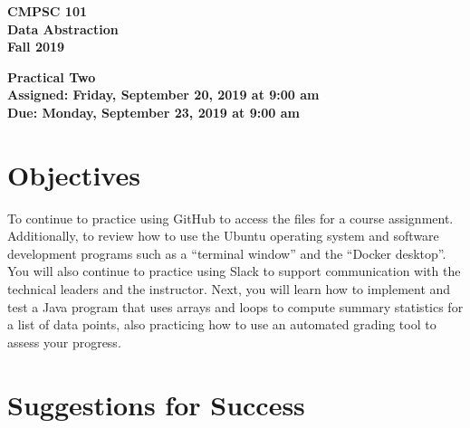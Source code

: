 \documentclass[11pt]{article}
\newcommand{\assignmentduedate}{September 23}
\newcommand{\assignmentassignedate}{September 20}
\newcommand{\assignmentnumber}{Two}
\newcommand{\labyear}{2019}
\newcommand{\labdueday}{Monday}
\newcommand{\labassignday}{Friday}
\newcommand{\labtime}{9:00 am}
\newcommand{\assigneddate}{Assigned: \labassignday, \assignmentassignedate, \labyear{} at \labtime{}}
\newcommand{\duedate}{Due: \labdueday, \assignmentduedate, \labyear{} at \labtime{}}
\newcommand{\labtitle}[1]
{
  \begin{center}
    \begin{center}
      \bf
      CMPSC 101\\Data Abstraction\\
      Fall 2019\\
      \medskip
    \end{center}
    \bf
    #1
  \end{center}
}
\begin{document}
\thispagestyle{empty}

\labtitle{Practical \assignmentnumber{} \\ \assigneddate{} \\ \duedate{}}

\section*{Objectives}

To continue to practice using GitHub to access the files for a course
assignment. Additionally, to review how to use the Ubuntu operating system and
software development programs such as a ``terminal window'' and the ``Docker
desktop''. You will also continue to practice using Slack to support
communication with the technical leaders and the instructor. Next, you will
learn how to implement and test a Java program that uses arrays and loops to
compute summary statistics for a list of data points, also practicing how to use
an automated grading tool to assess your progress.

\section*{Suggestions for Success}
\end{document}
